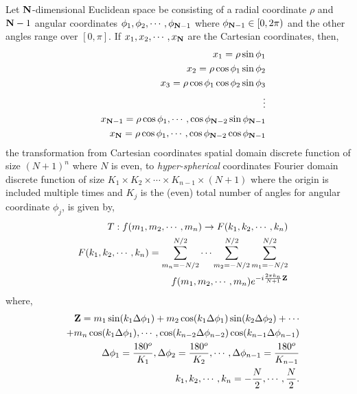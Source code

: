 \documentclass{UCF_ETD}
\begin{document}
Let ${\bf N}$-dimensional Euclidean space be consisting of a radial coordinate $\rho$ and ${\bf N}-1$ angular coordinates $\phi_1,\phi_2,\cdots, \phi_{{\bf N}-1}$ where $\phi_{{\bf N}-1}\in [0,2\pi)$ and the other angles range over $[0,\pi]$. If $x_1,x_2,\cdots,x_{\bf N}$ are the Cartesian coordinates, then,
\begin{eqnarray*}
&&x_1 = \rho \sin \phi_1 \\
&&x_2 = \rho \cos \phi_1 \sin \phi_2\\
&&x_3 = \rho \cos \phi_1 \cos \phi_2\sin \phi_3\\
&& \vdots\\
&&x_{{\bf N}-1} = \rho \cos \phi_1, \cdots, \cos \phi_{{\bf N}-2}\sin \phi_{{\bf N}-1}\\
&&x_{{\bf N}} = \rho \cos \phi_1, \cdots, \cos \phi_{{\bf N}-2}\cos \phi_{{\bf N}-1}
\end{eqnarray*}
the transformation from Cartesian coordinates spatial domain discrete function of size $(N+1)^n$ where $N$ is even, to \emph{hyper-spherical} coordinates Fourier domain discrete function of size  $K_1\times K_2 \times \cdots\times K_{n-1} \times (N+1)$ where the origin is included multiple times and $K_j$ is the (even) total number of angles for angular coordinate $\phi_j$, is given by,
\begin{eqnarray}\label{DiscreteHyperSphericalFourierTrans}
&& T:f(m_1,m_2,\cdots,m_n) \rightarrow F(k_1,k_2,\cdots,k_n)\nonumber \\
&& F(k_1, k_2, \cdots, k_n) = \sum\limits_{m_n=-N/2}^{N/2} \cdots\sum\limits_{m_2= -N/2}^{N/2} \sum\limits_{m_1= -N/2}^{N/2} \nonumber \\
&& \indent  f(m_1,m_2,\cdots,m_n)e^{-i\frac{2\pi k_n}{N+1} { {\bf Z} }} \nonumber \\
\end{eqnarray}
where,
\begin{eqnarray*}
&& {\bf Z} =  m_1\sin (k_1\Delta \phi_{1} )  + m_2  \cos (k_1\Delta \phi_1) \sin (k_2\Delta \phi_2)  + \cdots  \\
&& + m_n \cos (k_1\Delta\phi_1), \cdots, \cos (k_{n-2}\Delta \phi_{n-2})\cos (k_{n-1}\Delta \phi_{n-1})\\
&& \Delta\phi_1 = \frac{180^o}{K_1}, \Delta\phi_2 = \frac{180^o}{K_2},\cdots, \Delta\phi_{n-1} = \frac{180^o}{K_{n-1}} \\
&& k_1, k_2, \cdots, k_n = -\frac{N}{2},\cdots, \frac{N}{2}. \nonumber \\ 
\end{eqnarray*}
\end{document}
